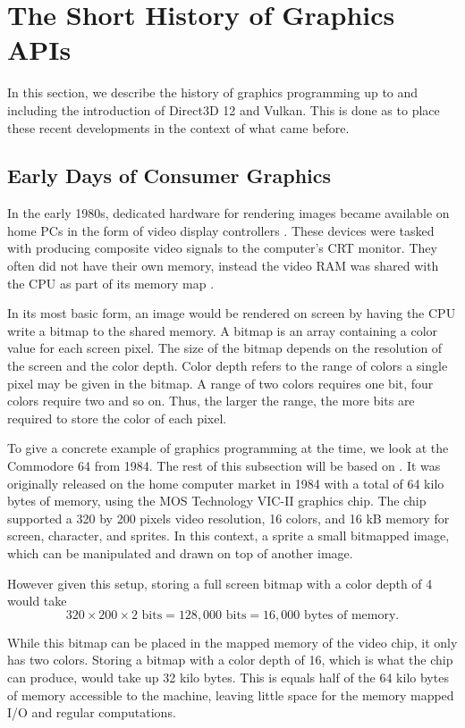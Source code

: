\section{The Short History of Graphics \acs{API}s}\label{sec:short_history}
In this section, we describe the history of graphics programming up to and including the introduction of Direct3D 12 and Vulkan.
This is done as to place these recent developments in the context of what came before.

\subsection{Early Days of Consumer Graphics}
In the early 1980s, dedicated hardware for rendering images became available on home PCs in the form of video display controllers \cite{wikiVideoDisplayController}.
These devices were tasked with producing composite video signals to the computer’s CRT monitor.
They often did not have their own memory, instead the video RAM was shared with the \gls{CPU} as part of its memory map \cite{wikipedia????shared}.


In its most basic form, an image would be rendered on screen by having the \gls{CPU} write a bitmap to the shared memory.
A bitmap is an array containing a color value for each screen pixel.
The size of the bitmap depends on the resolution of the screen and the color depth.
Color depth refers to the range of colors a single pixel may be given in the bitmap.
A range of two colors requires one bit, four colors require two and so on.
Thus, the larger the range, the more bits are required to store the color of each pixel.


To give a concrete example of graphics programming at the time, we look at the Commodore 64 from 1984.
The rest of this subsection will be based on \citet{commodore1983commodore}.
It was originally released on the home computer market in 1984 with a total of 64 kilo bytes of memory, using the MOS Technology VIC-II graphics chip.
The chip supported a 320 by 200 pixels video resolution, 16 colors, and 16 kB memory for screen, character, and sprites.
In this context, a sprite a small bitmapped image, which can be manipulated and drawn on top of another image.

However given this setup, storing a full screen bitmap with a color depth of 4 would take
$$320\times 200\times 2 \text{ bits} = 128,000 \text{ bits} = 16,000 \text{ bytes of memory.}$$

While this bitmap can be placed in the mapped memory of the video chip, it only has two colors.
Storing a bitmap with a color depth of 16, which is what the chip can produce, would take up 32 kilo bytes.
This is equals half of the 64 kilo bytes of memory accessible to the machine, leaving little space for the memory mapped I/O and regular computations.


